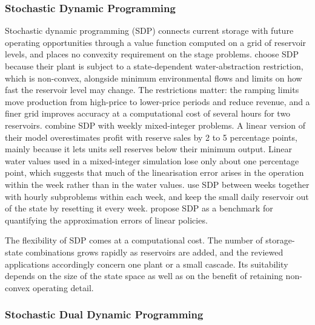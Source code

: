 \subsubsection{Stochastic Dynamic Programming}

Stochastic dynamic programming (SDP) connects current storage with
future operating opportunities through a value function computed on a
grid of reservoir levels, and places no convexity requirement on the
stage problems. \citet{alic2023optimal} choose SDP because their plant
is subject to a state-dependent water-abstraction restriction, which is
non-convex, alongside minimum environmental flows and limits on how fast
the reservoir level may change. The restrictions matter: the ramping
limits move production from high-price to lower-price periods and reduce
revenue, and a finer grid improves accuracy at a computational cost of
several hours for two reservoirs. \citet{helseth2017iet} combine SDP with
weekly mixed-integer problems. A linear version of their model
overestimates profit with reserve sales by 2 to 5 percentage points,
mainly because it lets units sell reserves below their minimum output.
Linear water values used in a mixed-integer simulation lose only about
one percentage point, which suggests that much of the linearisation
error arises in the operation within the week rather than in the water
values. \citet{abgottspon2014} use SDP between weeks together with hourly
subproblems within each week, and keep the small daily reservoir out of
the state by resetting it every week. \citet{perezdiaz2020medium} propose
SDP as a benchmark for quantifying the approximation errors of linear
policies.

The flexibility of SDP comes at a computational cost. The number of
storage-state combinations grows rapidly as reservoirs are added, and
the reviewed applications accordingly concern one plant or a small
cascade. Its suitability depends on the size of the state space as well
as on the benefit of retaining non-convex operating detail.

\subsubsection{Stochastic Dual Dynamic Programming}


